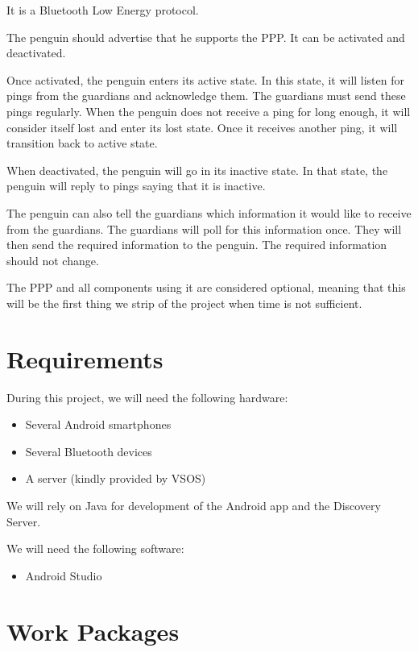 \documentclass{report}
\begin{document}
It is a Bluetooth Low Energy protocol.

The penguin should advertise that he supports the PPP. It can be activated and deactivated.

Once activated, the penguin enters its active state. In this state, it will listen for pings from the guardians and acknowledge them. The guardians must send these pings regularly. When the penguin does not receive a ping for long enough, it will consider itself lost and enter its lost state. Once it receives another ping, it will transition back to active state.

When deactivated, the penguin will go in its inactive state. In that state, the penguin will reply to pings saying that it is inactive.

The penguin can also tell the guardians which information it would like to receive from the guardians. The guardians will poll for this information once. They will then send the required information to the penguin. The required information should not change.

The PPP and all components using it are considered optional, meaning that this will be the first thing we strip of the project when time is not sufficient.

\section{Requirements}

During this project, we will need the following hardware:

\begin{itemize}
    \item Several Android smartphones
    \item Several Bluetooth devices
    \item A server (kindly provided by VSOS)
\end{itemize}

We will rely on Java for development of the Android app and the Discovery Server.

We will need the following software:

\begin{itemize}
    \item Android Studio
\end{itemize}


\section{Work Packages}
\end{document}
